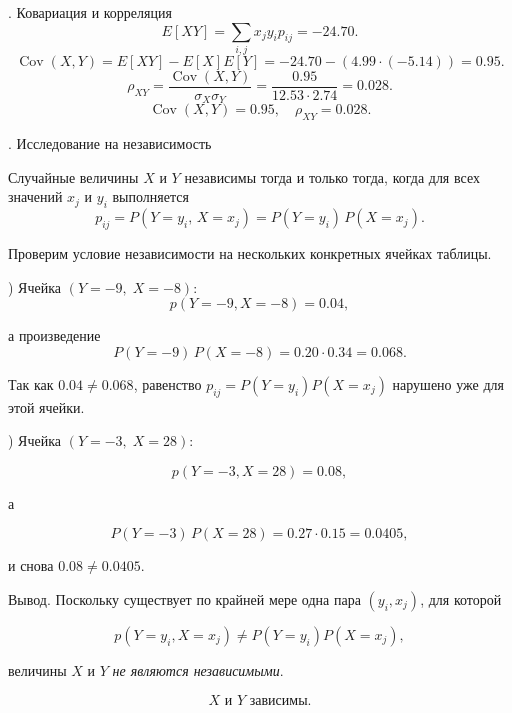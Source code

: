 \documentclass[a4paper,14pt]{extarticle}
\begin{document}
            . Ковариация и корреляция
            \[
                E[XY] = \sum_{i,j} x_j y_i p_{ij} = -24.70.
            \]
            \[
                \operatorname{Cov}(X,Y) = E[XY] - E[X]E[Y] = -24.70 - (4.99 \cdot (-5.14)) = 0.95.
            \]
            \[
                \rho_{XY} = \frac{\operatorname{Cov}(X,Y)}{\sigma_X \sigma_Y} = \frac{0.95}{12.53 \cdot 2.74} = 0.028.
            \]
            \[
                \boxed{\operatorname{Cov}(X,Y) = 0.95, \quad \rho_{XY} = 0.028.}
            \]
            
            . Исследование на независимость
            
            Случайные величины $X$ и $Y$ независимы тогда и только тогда, когда для всех значений $x_j$ и $y_i$ выполняется
            \[
                p_{ij}=P(Y=y_i,\,X=x_j)=P(Y=y_i)\,P(X=x_j).
            \]
            
            Проверим условие независимости на нескольких конкретных ячейках таблицы.
            
            ) Ячейка $(Y=-9,\;X=-8)$:
            \[
                p(Y=-9,X=-8)=0.04,
            \]
            
            а произведение
            \[
                P(Y=-9)\,P(X=-8)=0.20\cdot0.34=0.068.
            \]
            
            Так как \(0.04 \neq 0.068\), равенство \(p_{ij}=P(Y=y_i)P(X=x_j)\) нарушено уже для этой ячейки.
            
            ) Ячейка $(Y=-3,\;X=28)$:
            
            \[
                p(Y=-3,X=28)=0.08,
            \]
            
            а
            
            \[
                P(Y=-3)\,P(X=28)=0.27\cdot0.15=0.0405,
            \]
            
            и снова \(0.08 \neq 0.0405\).
            
            \noindent Вывод. Поскольку существует по крайней мере одна пара \((y_i,x_j)\), для которой
            
            \[
                p(Y=y_i,X=x_j)\neq P(Y=y_i)P(X=x_j),
            \]
            
            величины $X$ и $Y$ \emph{не являются независимыми}.
            
            \[
                \boxed{\text{$X$ и $Y$ зависимы.}}
            \]
\end{document}
